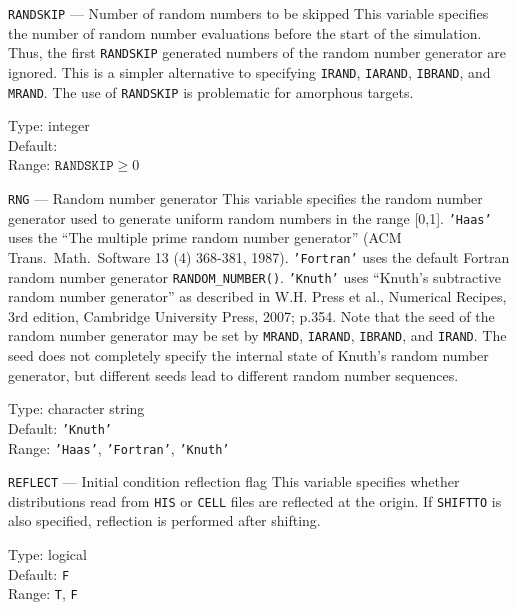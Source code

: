 \begin{keydescription}{\texttt{RANDSKIP} --- Number of random numbers to be skipped}
%
  This variable specifies the number of random number evaluations before the start 
  of the simulation. Thus, the first \texttt{RANDSKIP} generated numbers of the 
  random number generator are ignored. This is a simpler alternative to specifying
  \texttt{IRAND}, \texttt{IARAND}, \texttt{IBRAND}, and \texttt{MRAND}. The use of 
  \texttt{RANDSKIP} is problematic for amorphous targets.
%
  \begin{keytab}
    Type:    \> integer \\
    Default:  \\
    Range:   \> $\texttt{RANDSKIP} \ge 0$
  \end{keytab}
\end{keydescription}

\begin{keydescription}{\texttt{RNG} --- Random number generator}
%
  This variable specifies the random number generator used to generate uniform
  random numbers in the range [0,1]. \texttt{'Haas'} uses the ``The multiple 
  prime random number generator'' (ACM Trans.\ Math.\ Software 13 (4) 368-381, 
  1987). \texttt{'Fortran'} uses the default Fortran random number generator 
  \texttt{RANDOM\_NUMBER()}. \texttt{'Knuth'} uses ``Knuth's subtractive random 
  number generator'' as described in W.H. Press et al., Numerical Recipes, 3rd 
  edition, Cambridge University Press, 2007; p.354. Note that the seed of the
  random number generator may be set by \texttt{MRAND}, \texttt{IARAND}, 
  \texttt{IBRAND}, and \texttt{IRAND}. The seed does not completely specify 
  the internal state of Knuth's random number generator, but different seeds
  lead to different random number sequences.
%
  \begin{keytab}
    Type:    \> character string \\
    Default: \> \texttt{'Knuth'} \\
    Range:   \> \texttt{'Haas'}, \texttt{'Fortran'}, \texttt{'Knuth'} 
  \end{keytab}
\end{keydescription}

\begin{keydescription}{\texttt{REFLECT} --- Initial condition reflection flag}
%
  This variable specifies whether distributions read from \texttt{HIS} or
  \texttt{CELL} files are reflected at the origin. If \texttt{SHIFTTO} is also
  specified, reflection is performed after shifting.
%
  \begin{keytab}
    Type:    \> logical \\
    Default: \> \texttt{F} \\
    Range:   \> \texttt{T}, \texttt{F}
  \end{keytab}
\end{keydescription}

